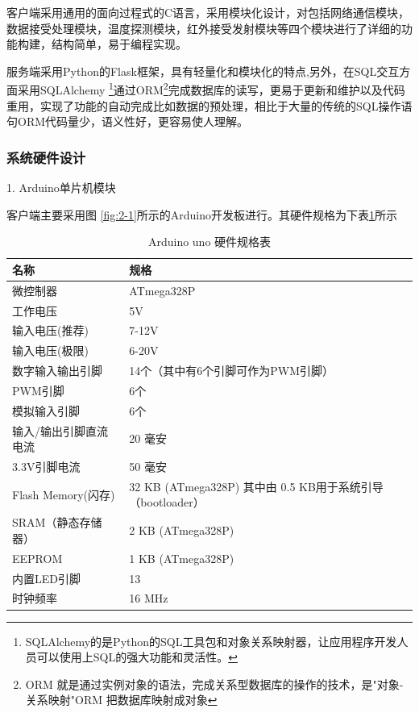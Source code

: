 客户端采用通用的面向过程式的C语言，采用模块化设计，对包括网络通信模块，数据接受处理模块，温度探测模块，红外接受发射模块等四个模块进行了详细的功能构建，结构简单，易于编程实现。

服务端采用Python的Flask框架，具有轻量化和模块化的特点,另外，在SQL交互方面采用SQLAlchemy \footnote{SQLAlchemy的是Python的SQL工具包和对象关系映射器，让应用程序开发人员可以使用上SQL的强大功能和灵活性。}通过ORM\footnote{ORM 就是通过实例对象的语法，完成关系型数据库的操作的技术，是"对象-关系映射"ORM 把数据库映射成对象}完成数据库的读写，更易于更新和维护以及代码重用，实现了功能的自动完成比如数据的预处理，相比于大量的传统的SQL操作语句ORM代码量少，语义性好，更容易使人理解。


\subsubsection{系统硬件设计}

1. Arduino单片机模块

客户端主要采用图 \ref{fig:2-1}所示的Arduino开发板进行。其硬件规格为下表\ref{tab1}所示

\begin{table}[htbp]
    \centering
	\caption{Arduino uno 硬件规格表}
	\label{tab1}
    \begin{tabular}{|l|l|}
    \hline
		名称 & 规格 \\ \hline
        微控制器 & ATmega328P \\ \hline
        工作电压 & 5V \\ \hline
        输入电压(推荐) & 7-12V \\ \hline
        输入电压(极限) & 6-20V \\ \hline
        数字输入输出引脚 & 14个（其中有6个引脚可作为PWM引脚） \\ \hline
        PWM引脚 & 6个 \\ \hline
        模拟输入引脚 & 6个 \\ \hline
        输入/输出引脚直流电流 & 20 毫安 \\ \hline
        3.3V引脚电流 & 50 毫安 \\ \hline
        Flash Memory(闪存) & 32 KB (ATmega328P) 其中由 0.5 KB用于系统引导（bootloader） \\ \hline
        SRAM（静态存储器） & 2 KB (ATmega328P) \\ \hline
        EEPROM & 1 KB (ATmega328P) \\ \hline
        内置LED引脚 & 13 \\ \hline
        时钟频率 & 16 MHz \\ \hline
    \end{tabular}
\end{table}

